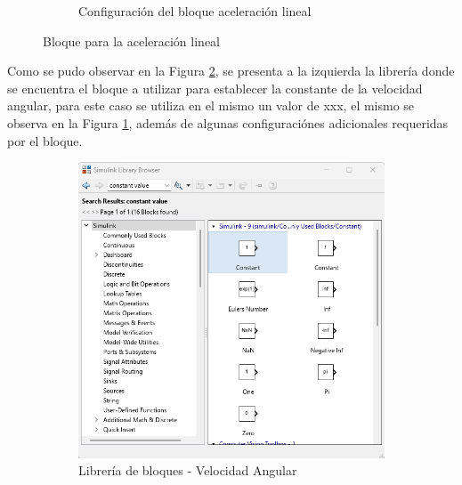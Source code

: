 \begin{figure}[htbp]
\begin{subfigure}[b]{0.45\textwidth}
        \caption{Configuración del bloque aceleración lineal}
        \label{fig:lib_bloques_config_linear_acceleration}
    \end{subfigure}
    \caption{Bloque para la aceleración lineal}
    \label{fig:linear_accel_block_simulink}
\end{figure}

Como se pudo observar en la Figura \ref{fig:linear_accel_block_simulink}, se presenta a la izquierda la librería donde se encuentra el bloque a utilizar para establecer la constante de la velocidad angular, para este caso se utiliza en el mismo un valor de xxx, el mismo se observa en la Figura \ref{fig:lib_bloques_config_linear_acceleration}, además de algunas configuraciónes adicionales requeridas por el bloque. 

\begin{figure}[htbp]
    \centering
    \begin{subfigure}[b]{0.45\textwidth}
        \centering
        \includegraphics[width=\textwidth]{fig/Capitulo5/Caso_de_estudio_IMU/Generador_de_archivos/libreria_de_bloques_constante_velocidad_angular.png}
        \caption{Librería de bloques - Velocidad Angular}
        \label{fig:lib_bloques_angular_velocity}
    \end{subfigure}
    \hfill
    \begin{subfigure}[b]{0.45\textwidth}
        \centering

\end{subfigure}
\end{figure}
